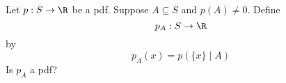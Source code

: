  Let $p : S \rightarrow \R$ be a pdf.
  Suppose $A \subseteq S$ and $p(A) \neq 0$.
  Define
  \[
  p_A : S \rightarrow \R
  \]
  by
  \[
  p_A(x) = p(\{x\} \mid A)
  \]
  Is $p_A$ a pdf?
